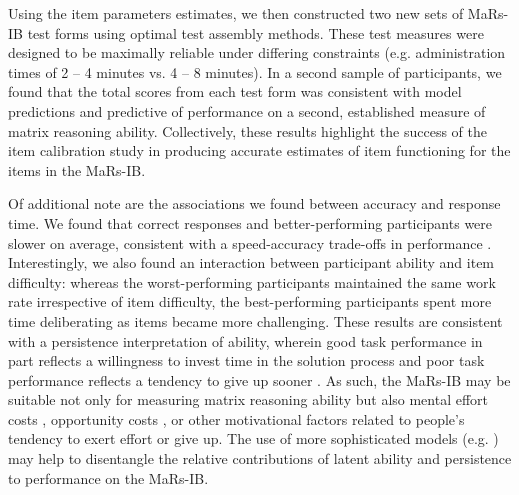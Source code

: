\documentclass[a4paper,man,natbib,noextraspace]{apa6}
\begin{document}
Using the item parameters estimates, we then constructed two new sets of MaRs-IB test forms using optimal test assembly methods. These test measures were designed to be maximally reliable under differing constraints (e.g. administration times of 2 -- 4 minutes vs. 4 -- 8 minutes). In a second sample of participants, we found that the total scores from each test form was consistent with model predictions and predictive of performance on a second, established measure of matrix reasoning ability. Collectively, these results highlight the success of the item calibration study in producing accurate estimates of item functioning for the items in the MaRs-IB. 

Of additional note are the associations we found between accuracy and response time. We found that correct responses and better-performing participants were slower on average, consistent with a speed-accuracy trade-offs in performance \citep{heitz2014speed}. Interestingly, we also found an interaction between participant ability and item difficulty: whereas the worst-performing participants maintained the same work rate irrespective of item difficulty, the best-performing participants spent more time deliberating as items became more challenging. These results are consistent with a persistence interpretation of ability, wherein good task performance in part reflects a willingness to invest time in the solution process and poor task performance reflects a tendency to give up sooner \citep{ranger2021effects}. As such, the MaRs-IB may be suitable not only for measuring matrix reasoning ability but also mental effort costs \citep{kool2018mental}, opportunity costs \citep{payne1996time}, or other motivational factors \citep{duckworth2011role} related to people's tendency to exert effort or give up. The use of more sophisticated models (e.g. \citealt{ranger2014accumulator}) may help to disentangle the relative contributions of latent ability and persistence to performance on the MaRs-IB.
\end{document}

